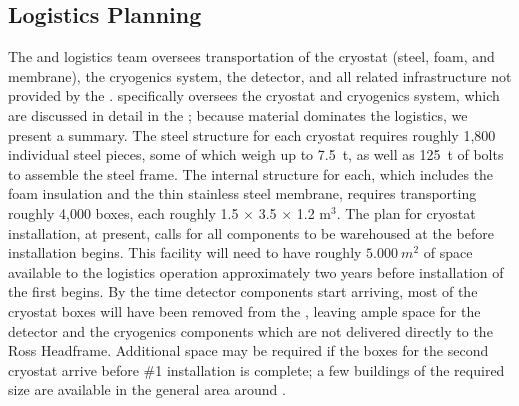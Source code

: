 \subsection{Logistics Planning}
\label{sec:fdsp-tc-logPln}

The  and  logistics team oversees transportation of the cryostat (steel, foam, and membrane), the cryogenics system, the detector, and all related infrastructure not provided by the . 
 specifically oversees the cryostat and cryogenics system, which are  discussed in detail in the  ; because  material dominates the logistics, we present a summary.  
The steel structure for each cryostat requires roughly 1,800 individual steel pieces,  some of which weigh up to \SI{7.5}{t}, as well as \SI{125}{t} of bolts to assemble the steel frame. 
The internal structure for each, which includes the foam insulation and the thin stainless steel membrane, requires transporting roughly 4,000 boxes, 
 each roughly 1.5 $\times$ 3.5 $\times$ 1.2 m$^3$. 
 The plan for cryostat installation, at present, calls for all components to be warehoused at the  before installation begins. 
This facility will need to have roughly $\SI{5,000}{m^2}$ of space available to the logistics operation approximately two years before installation of the first  begins. 
By the time detector components start arriving, most of the cryostat boxes will have been removed from the , leaving ample space for the detector and the cryogenics components which are not delivered directly to the Ross Headframe. 
Additional space may be required if the boxes for the second cryostat arrive before   \#1 installation is complete; a few buildings of the required size are available in the general area around . 


